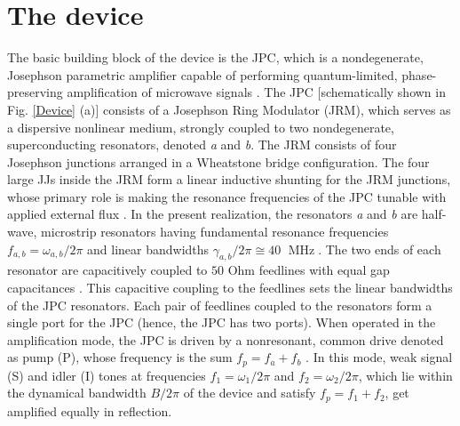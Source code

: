 \documentclass[aip,onecolumn,10pt]{revtex4}%
\begin{document}
\section{The device}  

The basic building block of the device is the JPC, which is a nondegenerate, Josephson parametric amplifier capable of performing  quantum-limited, phase-preserving amplification of microwave signals \cite{JPCnature,JPCreview}. The JPC [schematically shown in Fig. \ref{Device} (a)] consists of a Josephson Ring Modulator (JRM), which serves as a dispersive nonlinear medium, strongly coupled to two nondegenerate, superconducting resonators, denoted \textit{a} and \textit{b}. The JRM consists of four Josephson junctions arranged in a Wheatstone bridge configuration. The four large JJs inside the JRM form a linear inductive shunting for the JRM junctions, whose primary role is making the resonance frequencies of the JPC tunable with applied external flux \cite{Roch}. In the present realization, the resonators \textit{a} and \textit{b} are half-wave, microstrip resonators having fundamental resonance frequencies $f_{a,b}=\omega_{a,b}/2\pi$ and linear bandwidths $\gamma_{a,b}/2\pi\cong40$ $\operatorname{MHz}$. The two ends of each resonator are capacitively coupled to $50$ Ohm feedlines with equal gap capacitances \cite{Jamp}. This capacitive coupling to the feedlines sets the linear bandwidths of the JPC resonators. Each pair of feedlines coupled to the resonators form a single port for the JPC (hence, the JPC has two ports). When operated in the amplification mode, the JPC is driven by a nonresonant, common drive denoted as pump (P), whose frequency is the sum $f_p=f_a+f_b$ \cite{JPCreview,Jamp}. In this mode, weak signal (S) and idler (I) tones at frequencies $f_1=\omega_1/2\pi$ and $f_2=\omega_2/2\pi$, which lie within the dynamical bandwidth $B/2\pi$ of the device and satisfy $f_p=f_1+f_2$, get amplified equally in reflection. 
\end{document}
